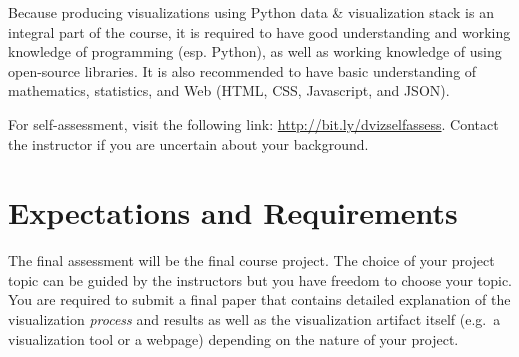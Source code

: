\documentclass[11pt,article,oneside]{memoir} %
\begin{document}
Because producing visualizations using Python data \& visualization stack is an integral part of the course, it is required to have good understanding and working knowledge of programming (esp. Python), as well as working knowledge of using open-source libraries. 
It is also recommended to have basic understanding of mathematics, statistics, and Web (HTML, CSS, Javascript, and JSON). 


For self-assessment, visit the following link: \href{http://bit.ly/dvizselfassess}{http://bit.ly/dvizselfassess}. 
Contact the instructor if you are uncertain about your background. 

\section{Expectations and Requirements}%
\label{sec:requirements}

The final assessment will be the final course project. 
The choice of your project topic can be guided by the instructors but you have freedom to choose your topic.
You are required to submit a final paper that contains detailed explanation of the visualization \emph{process} and results as well as the visualization artifact itself (e.g.~a visualization tool or a webpage) depending on the nature of your project. 
\end{document}
